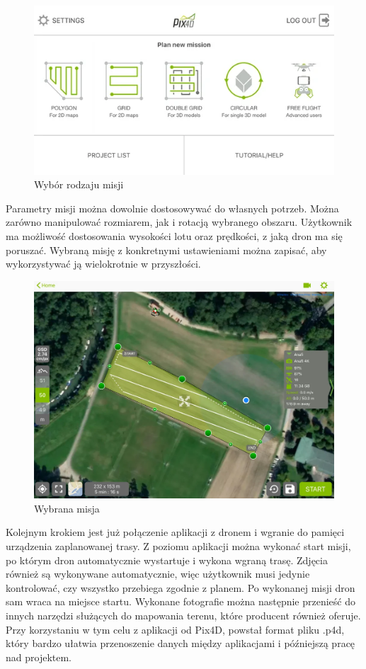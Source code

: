 \begin{figure}[H]
    \centering
    \includegraphics[width=\textwidth]{images/PIX4D_Wybor_misji.png}
    \caption{Wybór rodzaju misji}
\end{figure}

Parametry misji można dowolnie dostosowywać do własnych potrzeb. Można zarówno manipulować rozmiarem, jak i rotacją wybranego obszaru. Użytkownik ma możliwość dostosowania wysokości lotu oraz prędkości, z jaką dron ma się poruszać. Wybraną misję z konkretnymi ustawieniami można zapisać, aby wykorzystywać ją wielokrotnie w przyszłości.

\begin{figure}[H]
    \centering
    \includegraphics[width=\textwidth]{images/PIX4D_Przebieg_misji.png}
    \caption{Wybrana misja}
\end{figure}

Kolejnym krokiem jest już połączenie aplikacji z dronem i wgranie do pamięci urządzenia zaplanowanej trasy. Z poziomu aplikacji można wykonać start misji, po którym dron automatycznie wystartuje i wykona wgraną trasę. Zdjęcia również są wykonywane automatycznie, więc użytkownik musi jedynie kontrolować, czy wszystko przebiega zgodnie z planem. Po wykonanej misji dron sam wraca na miejsce startu. Wykonane fotografie można następnie przenieść do innych narzędzi służących do mapowania terenu, które producent również oferuje. Przy korzystaniu w tym celu z aplikacji od Pix4D, powstał format pliku .p4d, który bardzo ułatwia przenoszenie danych między aplikacjami i późniejszą pracę nad projektem.

